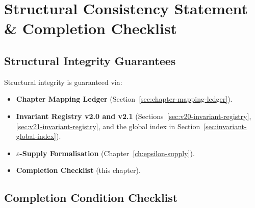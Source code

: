 
\chapter{Structural Consistency Statement \&
Completion Checklist}
\label{ch:consistency-statement-final}


\section{Structural Integrity Guarantees}
\label{sec:final-integrity-guarantees}

Structural integrity is guaranteed via:

\begin{itemize}
\item \textbf{Chapter Mapping Ledger}
(Section~\ref{sec:chapter-mapping-ledger}).
\item \textbf{Invariant Registry v2.0 and v2.1}
(Sections~\ref{sec:v20-invariant-registry},
\ref{sec:v21-invariant-registry}, and the global index in
Section~\ref{sec:invariant-global-index}).
\item \textbf{$\varepsilon$-Supply Formalisation}
(Chapter~\ref{ch:epsilon-supply}).
\item \textbf{Completion Checklist} (this chapter).
\end{itemize}

\section{Completion Condition Checklist}
\label{sec:final-checklist}

